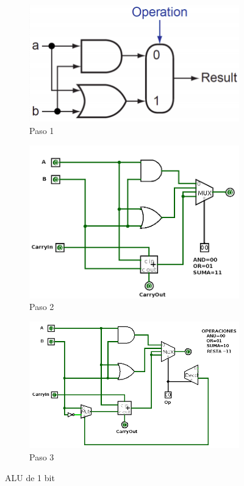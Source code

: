 \documentclass[10pt,letterpaper]{article}
\begin{document}
\begin{enumerate}
			\begin{figure}[h!]	
				\centering	
				\begin{subfigure}{0.35\linewidth}
					\centering
					\includegraphics[width=\linewidth]{Paso1.png}
					\caption{Paso 1}				
				\end{subfigure}
				\begin{subfigure}{0.35\linewidth}
				\centering
				\includegraphics[width=\linewidth]{Paso2}
				\caption{Paso 2}
				\end{subfigure}				
				\begin{subfigure}{0.35\textwidth}
					\centering
					\includegraphics[width=\textwidth]{Paso3}
					\caption{Paso 3}
				\end{subfigure}
			\caption{ALU de 1 bit}
			\end{figure}
		

\end{enumerate}
\end{document}
